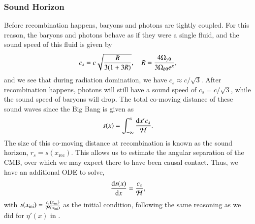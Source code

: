 \subsubsection{Sound Horizon } \label{sssec:M2:sound_horizon}
Before recombination happens, baryons and photons are tightly coupled. For this reason, the baryons and photons behave as if they were a single fluid, and the sound speed of this fluid is given by 
\begin{equation} \label{eq:M2:theory:soundspeed_R_baryons_and_photons}
    c_s = c \sqrt{\frac{R}{3(1+3R)}},\quad R = \frac{4\Omega_{\gamma 0}}{3\Omega_{b0} e^x},
\end{equation}
and we see that during radiation domination, we have $c_s \approx c/\sqrt{3}$. After recombination happens, photons will still have a sound speed of $c_s=c/\sqrt{3}$, while the sound speed of baryons will drop.  The total co-moving distance of these sound waves since the Big Bang is given as    
\begin{equation} \label{eq:M2:theory:sound_horizon_integral}
    s(x)=\int_{-\infty}^x \frac{\dd x' c_s}{\mathcal{H}}.
\end{equation}
The size of this co-moving distance at recombination is known as the sound horizon, $r_s = s(x_\mathrm{rec})$. This allows us to estimate the angular separation of the CMB, over which we may expect there to have been causal contact. Thus, we have an additional ODE to solve, 
\begin{equation} \label{eq:M2:theory:sound_horizon_ODE}
    \dv{s(x)}{x} = \frac{c_s}{\mathcal{H}},
\end{equation}
with $s(x_\mathrm{ini})=\frac{c_s(x_\mathrm{ini})}{\mathcal{H}(x_\mathrm{ini})}$ as the initial condition, following the same reasoning as we did for $\eta'(x)$ in . 

